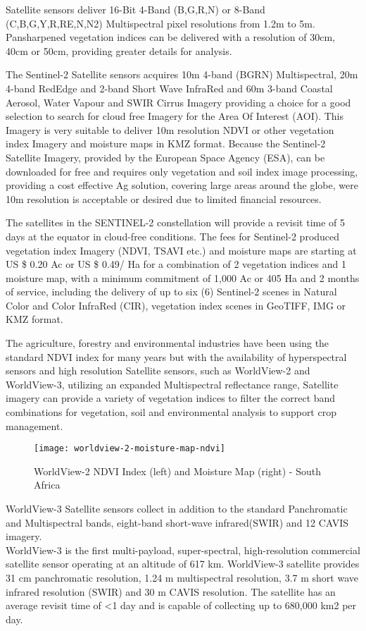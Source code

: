 Satellite sensors deliver 16-Bit 4-Band (B,G,R,N) or 8-Band (C,B,G,Y,R,RE,N,N2) Multispectral pixel resolutions from 1.2m to 5m. Pansharpened vegetation indices can be delivered with a resolution of 30cm, 40cm or 50cm, providing greater details for analysis. 

The Sentinel-2 Satellite sensors acquires 10m 4-band (BGRN) Multispectral, 20m 4-band RedEdge and 2-band Short Wave InfraRed and 60m 3-band Coastal Aerosol, Water Vapour and SWIR Cirrus Imagery providing a choice for a good selection to search for cloud free Imagery for the Area Of Interest (AOI). This Imagery is very suitable to deliver 10m resolution NDVI or other vegetation index Imagery and moisture maps in KMZ format. Because the Sentinel-2 Satellite Imagery, provided by the European Space Agency (ESA), can be downloaded for free and requires only vegetation and soil index image processing, providing a cost effective Ag solution, covering large areas around the globe, were 10m resolution is acceptable or desired due to limited financial resources.

The satellites in the SENTINEL-2 constellation will provide a revisit time of 5 days at the equator in cloud-free conditions. The fees for Sentinel-2 produced vegetation index Imagery (NDVI, TSAVI etc.) and moisture maps are starting at US \$ 0.20\/ Ac or US \$ 0.49/ Ha for a combination of 2 vegetation indices and 1 moisture map, with a minimum commitment of 1,000 Ac or 405 Ha and 2 months of service, including the delivery of up to six (6) Sentinel-2 scenes in Natural Color and Color InfraRed (CIR), vegetation index scenes in GeoTIFF, IMG or KMZ format.

The agriculture, forestry and environmental industries have been using the standard NDVI index for many years but with the availability of hyperspectral sensors and high resolution Satellite sensors, such as WorldView-2 and WorldView-3, utilizing an expanded Multispectral reflectance range, Satellite imagery can provide a variety of vegetation indices to filter the correct band combinations for vegetation, soil and environmental analysis to support crop management.

\begin{figure}[htbp]
  \centering
  \texttt{[image: worldview-2-moisture-map-ndvi]}
  \caption{WorldView-2 NDVI Index (left) and Moisture Map (right) - South Africa}
  \label{fig:worldview-2-moisture-map-ndvi}
\end{figure}


WorldView-3 Satellite sensors collect in addition to the standard Panchromatic and Multispectral bands, eight-band short-wave infrared(SWIR) and 12 CAVIS imagery.\\\mbox{WorldView-3} is the first multi-payload, super-spectral, high-resolution commercial satellite sensor operating at an altitude of 617 km. WorldView-3 satellite provides 31 cm panchromatic resolution, 1.24 m multispectral resolution, 3.7 m short wave infrared resolution (SWIR) and 30 m CAVIS resolution. The satellite has an average revisit time of <1 day and is capable of collecting up to 680,000 km2 per day.

